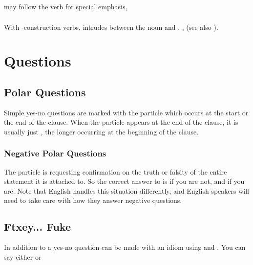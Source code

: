 \subsubsection{}  may follow the verb for special emphasis,
 

\subsubsection{} With -construction verbs,  intrudes
between the noun and ,  ,
  (see also
).



\section{Questions}
\subsection{Polar Questions} 
Simple yes-no questions are marked with the particle  which
occurs at the start or the end of the clause.  When the particle
appears at the end of the clause, it is usually just , the
longer  occurring at the beginning of the
clause.   

\subsubsection{Negative Polar Questions} 
The particle  is requesting confirmation on the truth or
falsity of the entire statement it is attached to.  So the correct
answer to  
is  if you are not, and  if you are.  Note that
English handles this situation differently, and English speakers will
need to take care with how they answer negative questions.

\subsection{Ftxey... Fuke} In addition to  a yes-no
question can be made with an idiom using   and
 .  You can say either 
 or   
\label{syn:question:ftxey}

